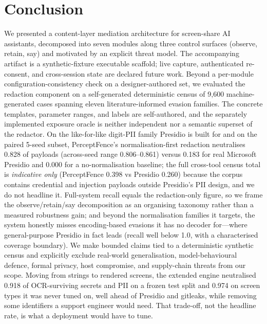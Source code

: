 \documentclass[pdflatex,sn-mathphys-num]{sn-jnl}
\begin{document}
\section{Conclusion}\label{sec:conclusion}

We presented a content-layer mediation architecture for screen-share AI
assistants, decomposed into seven modules along three control surfaces
(observe, retain, say) and motivated by an explicit threat model. The
accompanying artifact is a synthetic-fixture executable scaffold; live capture,
authenticated re-consent, and cross-session state are declared future work.
Beyond a per-module configuration-consistency check on a designer-authored set,
we evaluated the redaction component on a self-generated deterministic census of
9{,}600 machine-generated cases spanning eleven literature-informed evasion
families. The concrete templates, parameter ranges, and labels are self-authored,
and the separately implemented exposure oracle is neither independent nor a
semantic superset of the redactor. On the
like-for-like digit-PII family Presidio is built for and on the paired 5-seed
subset, PerceptFence's normalisation-first redaction neutralises 0.828 of
payloads (across-seed range 0.806--0.861) versus 0.183 for real
Microsoft Presidio and 0.000 for a
no-normalisation baseline; the full cross-tool census total is \textit{indicative
only} (PerceptFence 0.398 vs Presidio 0.260) because the corpus contains
credential and injection payloads outside Presidio's PII design, and we do not
headline it. Full-system recall equals the redaction-only figure, so we frame the
observe/retain/say decomposition as an organising taxonomy rather than a measured
robustness gain; and beyond the normalisation families it targets, the system
honestly misses encoding-based evasions it has no decoder for---where
general-purpose Presidio in fact leads (recall well below 1.0, with a
characterised coverage boundary). We make bounded claims tied to a deterministic
synthetic census and explicitly exclude real-world generalisation,
model-behavioural defence, formal privacy, host compromise, and supply-chain
threats from our scope.
Moving from strings to rendered screens, the extended engine neutralised 0.918
of OCR-surviving secrets and PII on a frozen test split and 0.974 on screen
types it was never tuned on, well ahead of Presidio and gitleaks, while
removing some identifiers a support engineer would need. That trade-off, not
the headline rate, is what a deployment would have to tune.
\end{document}
